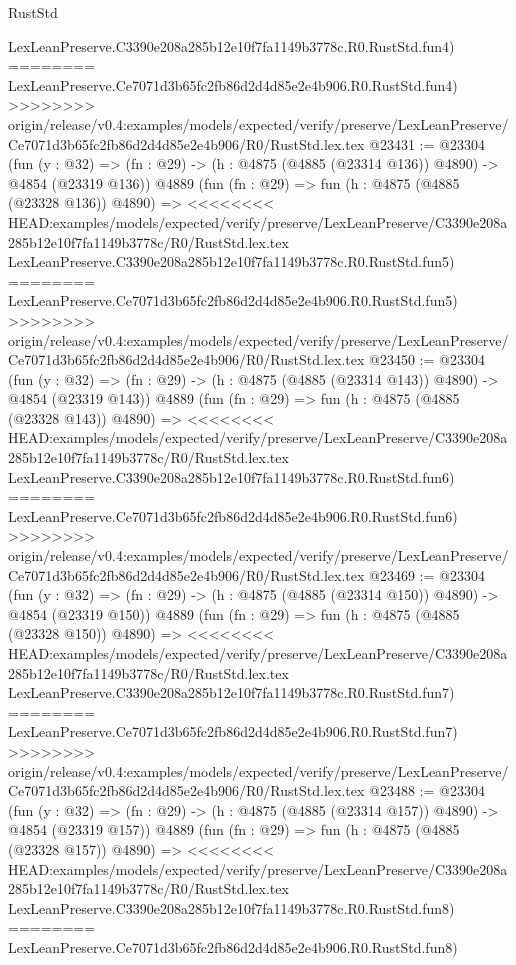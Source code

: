 \begin{lexlean}{RustStd}
\begin{coremodule}
{\begin{coremodule}
{{{{{{{{{{{{{{{{{{{{{{{{{{{{{    LexLeanPreserve.C3390e208a285b12e10f7fa1149b3778c.R0.RustStd.fun4)
========
    LexLeanPreserve.Ce7071d3b65fc2fb86d2d4d85e2e4b906.R0.RustStd.fun4)
>>>>>>>> origin/release/v0.4:examples/models/expected/verify/preserve/LexLeanPreserve/Ce7071d3b65fc2fb86d2d4d85e2e4b906/R0/RustStd.lex.tex
@23431 := @23304
    (fun (y : @32) => (fn : @29) -> (h : @4875 (@4885 (@23314 @136)) @4890) -> @4854 (@23319 @136))
    @4889
    (fun (fn : @29) =>
    fun (h : @4875 (@4885 (@23328 @136)) @4890) =>
<<<<<<<< HEAD:examples/models/expected/verify/preserve/LexLeanPreserve/C3390e208a285b12e10f7fa1149b3778c/R0/RustStd.lex.tex
    LexLeanPreserve.C3390e208a285b12e10f7fa1149b3778c.R0.RustStd.fun5)
========
    LexLeanPreserve.Ce7071d3b65fc2fb86d2d4d85e2e4b906.R0.RustStd.fun5)
>>>>>>>> origin/release/v0.4:examples/models/expected/verify/preserve/LexLeanPreserve/Ce7071d3b65fc2fb86d2d4d85e2e4b906/R0/RustStd.lex.tex
@23450 := @23304
    (fun (y : @32) => (fn : @29) -> (h : @4875 (@4885 (@23314 @143)) @4890) -> @4854 (@23319 @143))
    @4889
    (fun (fn : @29) =>
    fun (h : @4875 (@4885 (@23328 @143)) @4890) =>
<<<<<<<< HEAD:examples/models/expected/verify/preserve/LexLeanPreserve/C3390e208a285b12e10f7fa1149b3778c/R0/RustStd.lex.tex
    LexLeanPreserve.C3390e208a285b12e10f7fa1149b3778c.R0.RustStd.fun6)
========
    LexLeanPreserve.Ce7071d3b65fc2fb86d2d4d85e2e4b906.R0.RustStd.fun6)
>>>>>>>> origin/release/v0.4:examples/models/expected/verify/preserve/LexLeanPreserve/Ce7071d3b65fc2fb86d2d4d85e2e4b906/R0/RustStd.lex.tex
@23469 := @23304
    (fun (y : @32) => (fn : @29) -> (h : @4875 (@4885 (@23314 @150)) @4890) -> @4854 (@23319 @150))
    @4889
    (fun (fn : @29) =>
    fun (h : @4875 (@4885 (@23328 @150)) @4890) =>
<<<<<<<< HEAD:examples/models/expected/verify/preserve/LexLeanPreserve/C3390e208a285b12e10f7fa1149b3778c/R0/RustStd.lex.tex
    LexLeanPreserve.C3390e208a285b12e10f7fa1149b3778c.R0.RustStd.fun7)
========
    LexLeanPreserve.Ce7071d3b65fc2fb86d2d4d85e2e4b906.R0.RustStd.fun7)
>>>>>>>> origin/release/v0.4:examples/models/expected/verify/preserve/LexLeanPreserve/Ce7071d3b65fc2fb86d2d4d85e2e4b906/R0/RustStd.lex.tex
@23488 := @23304
    (fun (y : @32) => (fn : @29) -> (h : @4875 (@4885 (@23314 @157)) @4890) -> @4854 (@23319 @157))
    @4889
    (fun (fn : @29) =>
    fun (h : @4875 (@4885 (@23328 @157)) @4890) =>
<<<<<<<< HEAD:examples/models/expected/verify/preserve/LexLeanPreserve/C3390e208a285b12e10f7fa1149b3778c/R0/RustStd.lex.tex
    LexLeanPreserve.C3390e208a285b12e10f7fa1149b3778c.R0.RustStd.fun8)
========
    LexLeanPreserve.Ce7071d3b65fc2fb86d2d4d85e2e4b906.R0.RustStd.fun8)
}}}}}}}}}}}}}}}}}}}}}}}}}}}}}
\end{coremodule}}
\end{coremodule}
\end{lexlean}
